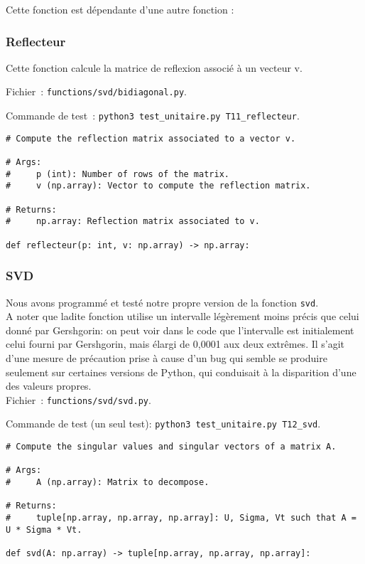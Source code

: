 \documentclass{article}
\begin{document}
Cette fonction est dépendante d'une autre fonction :

\subsubsection{Reflecteur}

Cette fonction calcule la matrice de reflexion associé à un vecteur v.

Fichier~: \texttt{functions/svd/bidiagonal.py}.

Commande de test~: \texttt{python3 test\_unitaire.py T11\_reflecteur}.

\begin{small}
\begin{verbatim}
# Compute the reflection matrix associated to a vector v.

# Args:
#     p (int): Number of rows of the matrix.
#     v (np.array): Vector to compute the reflection matrix.

# Returns:
#     np.array: Reflection matrix associated to v.

def reflecteur(p: int, v: np.array) -> np.array:
\end{verbatim}
\end{small}

\subsubsection{SVD}

Nous avons programmé et testé notre propre version de la fonction \texttt{svd}. \\
A noter que ladite fonction utilise un intervalle légèrement moins précis que celui donné par Gershgorin: on peut voir
dans le code que l'intervalle est initialement celui fourni par Gershgorin, mais élargi de 0,0001 aux deux extrêmes.
Il s'agit d'une mesure de précaution prise à cause d'un bug qui semble se produire seulement sur certaines versions
de Python, qui conduisait à la disparition d'une des valeurs propres. \\

Fichier~: \texttt{functions/svd/svd.py}.

Commande de test (un seul test): \texttt{python3 test\_unitaire.py T12\_svd}.

\begin{small}
\begin{verbatim}
# Compute the singular values and singular vectors of a matrix A.

# Args:
#     A (np.array): Matrix to decompose.

# Returns:
#     tuple[np.array, np.array, np.array]: U, Sigma, Vt such that A = U * Sigma * Vt.

def svd(A: np.array) -> tuple[np.array, np.array, np.array]:
\end{verbatim}
\end{small}
\end{document}
